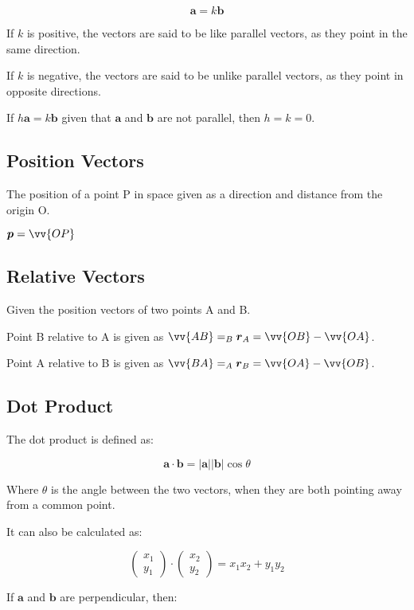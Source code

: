 \documentclass[a4paper,11pt]{article}
\newcommand{\bb}{\boldsymbol}
\begin{document}
$$
\bb{a} = k \bb{b}
$$

If $k$ is positive, the vectors are said to be like parallel vectors, as they
point in the same direction.

If $k$ is negative, the vectors are said to be unlike parallel vectors, as they
point in opposite directions.

If $h \bb{a} = k \bb{b}$ given that $\bb{a}$ and $\bb{b}$ are not parallel, then
$h = k = 0$.


\subsection{Position Vectors}

The position of a point P in space given as a direction and distance from the
origin O.

$\bb{p} = \vv{OP}$


\subsection{Relative Vectors}

Given the position vectors of two points A and B.

Point B relative to A is given as $\vv{AB} = _B\bb{r}_A = \vv{OB} - \vv{OA}$.

Point A relative to B is given as $\vv{BA} = _A\bb{r}_B = \vv{OA} - \vv{OB}$.


\subsection{Dot Product}

The dot product is defined as:

$$
\bb{a} \cdot \bb{b} = \lvert \bb{a} \rvert \lvert \bb{b} \rvert \cos{\theta}
$$

Where $\theta$ is the angle between the two vectors, when they are both pointing
away from a common point.

It can also be calculated as:

$$
\begin{pmatrix} x_1\\ y_1 \end{pmatrix} \cdot \begin{pmatrix} x_2\\ y_2 \end{pmatrix} = x_1 x_2 + y_1 y_2
$$

If $\bb{a}$ and $\bb{b}$ are perpendicular, then:
\end{document}
